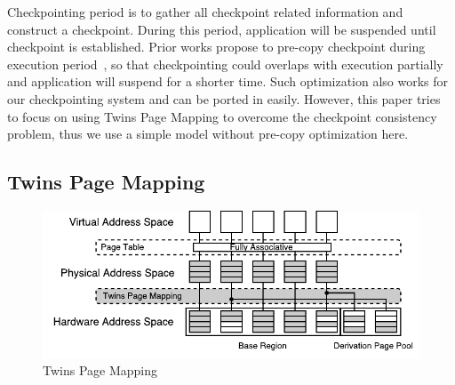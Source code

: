\documentclass[conference]{IEEEtran}
\begin{document}


Checkpointing period is to gather all checkpoint related information and construct a checkpoint.
During this period, application will be suspended until checkpoint is established.
Prior works propose to pre-copy checkpoint during execution period~\cite{kannan_optimizing_2013, gao_real-time_2015}, so that checkpointing could overlaps with execution partially and application will suspend for a shorter time.
Such optimization also works for our checkpointing system and can be ported in easily.
However, this paper tries to focus on using Twins Page Mapping to overcome the checkpoint consistency problem, thus we use a simple model without pre-copy optimization here.

\subsection{Twins Page Mapping}\label{sec:page_mapping}

\begin{figure}
    \includegraphics[width=\columnwidth]{page_mapping_2}
    \caption{Twins Page Mapping}
\label{fig:page_mapping}
\end{figure}
\end{document}
